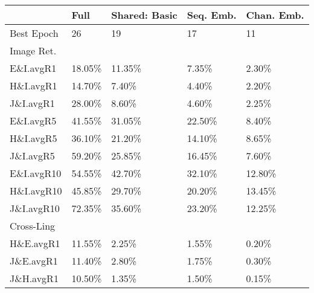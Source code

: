 \begin{table}
    \centering
    \begin{tabular}{l|l|lll}
    \toprule
    {} & Full & Shared: Basic & Seq. Emb. & Chan. Emb.\\
    \midrule
    Best Epoch  &                      26 &                     19 &                            17 &                        11 \\
    \midrule
    Image Ret. &&&&\\
    \midrule
    \midrule
    E\&I.avgR1   &                  18.05\% &                 11.35\% &                         7.35\% &                     2.30\% \\
    H\&I.avgR1   &                  14.70\% &                  7.40\% &                         4.40\% &                     2.20\% \\
    J\&I.avgR1   &                  28.00\% &                  8.60\% &                         4.60\% &                     2.25\% \\
    \midrule
    E\&I.avgR5   &                  41.55\% &                 31.05\% &                        22.50\% &                     8.40\% \\
    H\&I.avgR5   &                  36.10\% &                 21.20\% &                        14.10\% &                     8.65\% \\
    J\&I.avgR5   &                  59.20\% &                 25.85\% &                        16.45\% &                     7.60\% \\
    \midrule
    E\&I.avgR10  &                  54.55\% &                 42.70\% &                        32.10\% &                    12.80\% \\
    H\&I.avgR10  &                  45.85\% &                 29.70\% &                        20.20\% &                    13.45\% \\
    J\&I.avgR10  &                  72.35\% &                 35.60\% &                        23.20\% &                    12.25\% \\
    \midrule
     Cross-Ling&&&&\\
    \midrule
    \midrule
    H\&E.avgR1   &                  11.55\% &                  2.25\% &                         1.55\% &                     0.20\% \\
    J\&E.avgR1   &                  11.40\% &                  2.80\% &                         1.75\% &                     0.30\% \\
    J\&H.avgR1   &                  10.50\% &                  1.35\% &                         1.50\% &                     0.15\% \\

\end{tabular}
\end{table}
